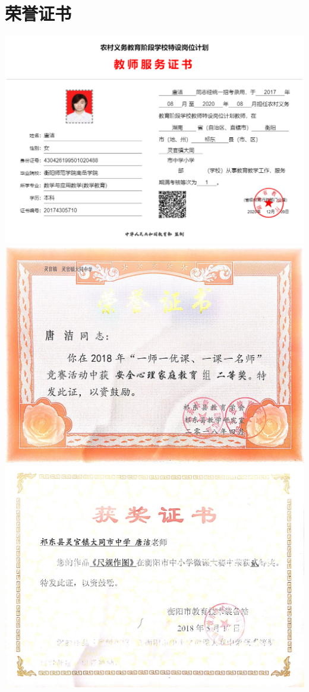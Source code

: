 \documentclass[UFT8]{ctexart}%
\begin{document}
\section{荣誉证书}
\begin{center}
 \includegraphics[scale=0.2]{figs/特岗服务证书.JPG }
 \includegraphics[scale=0.25]{figs/201804.JPG }
 \includegraphics[scale=0.25]{figs/20180517.JPG }

\end{center}
\end{document}
